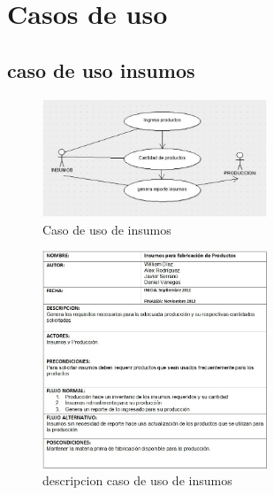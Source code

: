 \chapter{Casos de uso}
\section{caso de uso insumos}
\begin{figure}[htbp]
	\centering
		\includegraphics[width=0.60\textwidth]{images/casoinsumosgrafico.jpg}
	\caption{Caso de uso de insumos}
	\label{fig:Caso de uso de insumos}
\end{figure}%
\begin{figure}[htbp]
	\centering
		\includegraphics[width=0.60\textwidth]{images/casoinsumotabla.jpg}
	\caption{descripcion caso de uso de insumos}
	\label{fig:descripcion caso de uso de insumos}
\end{figure}%
